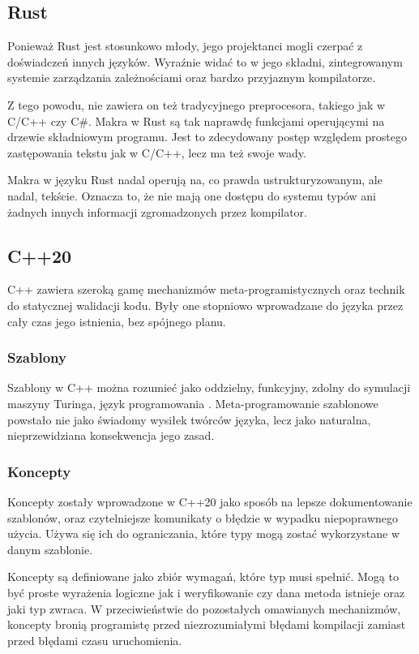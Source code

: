 \documentclass[conference]{IEEEtran}
\begin{document}
\subsection {Rust}
Ponieważ Rust jest stosunkowo młody, jego projektanci mogli czerpać z doświadczeń innych języków. Wyraźnie widać to w jego składni, zintegrowanym systemie zarządzania zależnościami oraz bardzo przyjaznym kompilatorze.\par
Z tego powodu, nie zawiera on też tradycyjnego preprocesora, takiego jak w C/C++ czy C\#. Makra w Rust są tak naprawdę funkcjami operującymi na drzewie składniowym programu. Jest to zdecydowany postęp względem prostego zastępowania tekstu jak w C/C++, lecz ma też swoje wady.\par
Makra w języku Rust nadal operują na, co prawda ustrukturyzowanym, ale nadal, tekście. Oznacza to, że nie mają one dostępu do systemu typów ani żadnych innych informacji zgromadzonych przez kompilator.\par
\subsection{C++20}
C++ zawiera szeroką gamę mechanizmów meta-programistycznych oraz technik do statycznej walidacji kodu. Były one stopniowo wprowadzane do języka przez cały czas jego istnienia, bez spójnego planu.\par
\subsubsection{Szablony}
Szablony w C++ można rozumieć jako oddzielny, funkcyjny, zdolny do symulacji maszyny Turinga, język programowania \cite{template_turing_complete}. Meta-programowanie szablonowe powstało nie jako świadomy wysiłek twórców języka, lecz jako naturalna, nieprzewidziana konsekwencja jego zasad.\par
\subsubsection{Koncepty}
Koncepty zostały wprowadzone w C++20 jako sposób na lepsze dokumentowanie szablonów, oraz czytelniejsze komunikaty o błędzie w wypadku niepoprawnego użycia. Używa się ich do ograniczania, które typy mogą zostać wykorzystane w danym szablonie.\par
Koncepty są definiowane jako zbiór wymagań, które typ musi spełnić. Mogą to być proste wyrażenia logiczne jak i weryfikowanie czy dana metoda istnieje oraz jaki typ zwraca. W przeciwieństwie do pozostałych omawianych mechanizmów, koncepty bronią programistę przed niezrozumiałymi błędami kompilacji zamiast przed błędami czasu uruchomienia.\par
\end{document}
